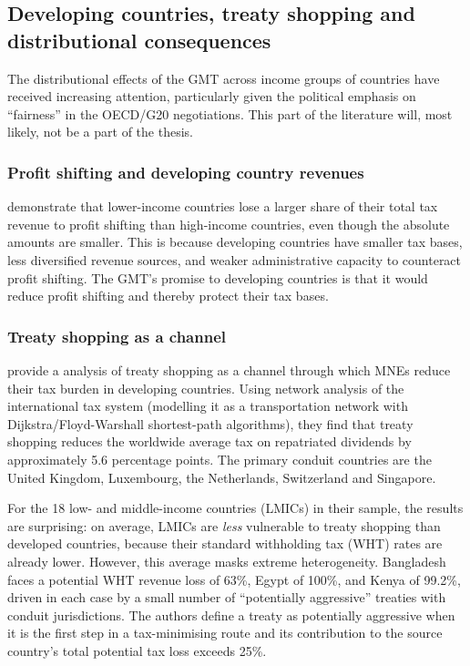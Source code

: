 \documentclass[11pt,a4paper]{article}
\begin{document}
\subsection{Developing countries, treaty shopping and distributional consequences}\label{sec:developing}

The distributional effects of the GMT across income groups of countries have received increasing attention, particularly given the political emphasis on ``fairness'' in the OECD/G20 negotiations. This part of the literature will, most likely, not be a part of the thesis. 

\subsubsection{Profit shifting and developing country revenues}

\citet{garcia2024} demonstrate that lower-income countries lose a larger share of their total tax revenue to profit shifting than high-income countries, even though the absolute amounts are smaller. This is because developing countries have smaller tax bases, less diversified revenue sources, and weaker administrative capacity to counteract profit shifting. The GMT's promise to developing countries is that it would reduce profit shifting and thereby protect their tax bases.

\subsubsection{Treaty shopping as a channel}

\citet{vantriet2025} provide a analysis of treaty shopping as a channel through which MNEs reduce their tax burden in developing countries. Using network analysis of the international tax system (modelling it as a transportation network with Dijkstra/Floyd-Warshall shortest-path algorithms), they find that treaty shopping reduces the worldwide average tax on repatriated dividends by approximately 5.6 percentage points. The primary conduit countries are the United Kingdom, Luxembourg, the Netherlands, Switzerland and Singapore.

For the 18 low- and middle-income countries (LMICs) in their sample, the results are surprising: on average, LMICs are \textit{less} vulnerable to treaty shopping than developed countries, because their standard withholding tax (WHT) rates are already lower. However, this average masks extreme heterogeneity. Bangladesh faces a potential WHT revenue loss of 63\%, Egypt of 100\%, and Kenya of 99.2\%, driven in each case by a small number of ``potentially aggressive'' treaties with conduit jurisdictions. The authors define a treaty as potentially aggressive when it is the first step in a tax-minimising route and its contribution to the source country's total potential tax loss exceeds 25\%.
\end{document}
